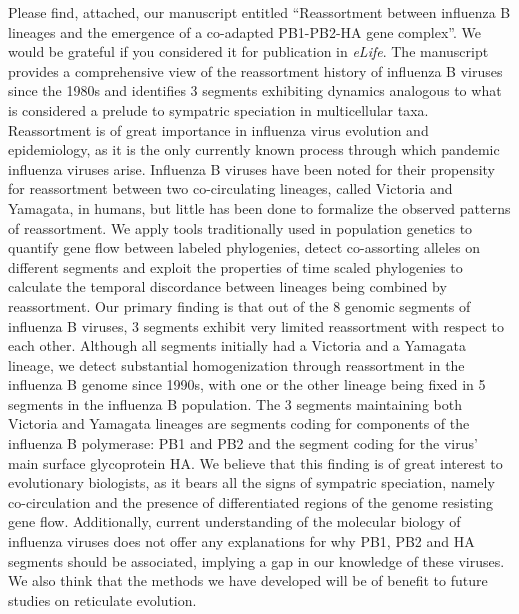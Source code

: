 \documentclass[stdletter,letterpaper,addrfromright,orderfromdateto,dateleft,11pt,noaddrto,sigleft]{newlfm}
\begin{document}
\begin{newlfm}
Please find, attached, our manuscript entitled ``Reassortment between influenza B lineages and the emergence of a co-adapted PB1-PB2-HA gene complex''.
We would be grateful if you considered it for publication in \textit{eLife}.
The manuscript provides a comprehensive view of the reassortment history of influenza B viruses since the 1980s and identifies 3 segments exhibiting dynamics analogous to what is considered a prelude to sympatric speciation in multicellular taxa.
Reassortment is of great importance in influenza virus evolution and epidemiology, as it is the only currently known process through which pandemic influenza viruses arise.
Influenza B viruses have been noted for their propensity for reassortment between two co-circulating lineages, called Victoria and Yamagata, in humans, but little has been done to formalize the observed patterns of reassortment.
We apply tools traditionally used in population genetics to quantify gene flow between labeled phylogenies, detect co-assorting alleles on different segments and exploit the properties of time scaled phylogenies to calculate the temporal discordance between lineages being combined by reassortment.
Our primary finding is that out of the 8 genomic segments of influenza B viruses, 3 segments exhibit very limited reassortment with respect to each other.
Although all segments initially had a Victoria and a Yamagata lineage, we detect substantial homogenization through reassortment in the influenza B genome since 1990s, with one or the other lineage being fixed in 5 segments in the influenza B population.
The 3 segments maintaining both Victoria and Yamagata lineages are segments coding for components of the influenza B polymerase: PB1 and PB2 and the segment coding for the virus' main surface glycoprotein HA.
We believe that this finding is of great interest to evolutionary biologists, as it bears all the signs of sympatric speciation, namely co-circulation and the presence of differentiated regions of the genome resisting gene flow.
Additionally, current understanding of the molecular biology of influenza viruses does not offer any explanations for why PB1, PB2 and HA segments should be associated, implying a gap in our knowledge of these viruses.
We also think that the methods we have developed will be of benefit to future studies on reticulate evolution.

\end{newlfm}
\end{document}
